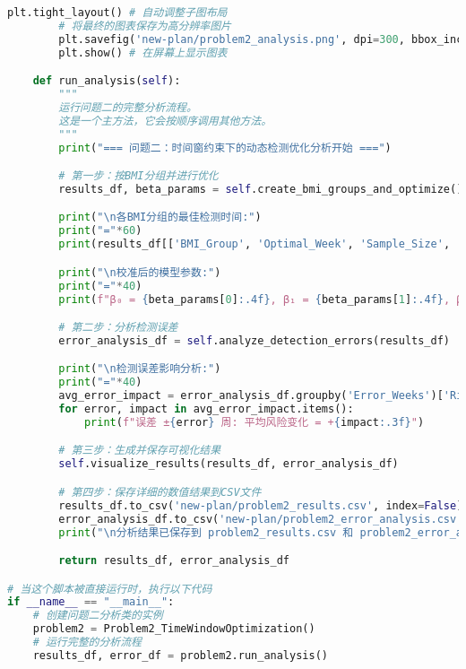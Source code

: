 \documentclass[UTF8, a4paper, 11pt]{ctexart}
\begin{document}
\begin{lstlisting}[language=Python, caption={问题二的解决方案脚本。}]
        plt.tight_layout() # 自动调整子图布局
        # 将最终的图表保存为高分辨率图片
        plt.savefig('new-plan/problem2_analysis.png', dpi=300, bbox_inches='tight')
        plt.show() # 在屏幕上显示图表

    def run_analysis(self):
        """
        运行问题二的完整分析流程。
        这是一个主方法，它会按顺序调用其他方法。
        """
        print("=== 问题二：时间窗约束下的动态检测优化分析开始 ===")

        # 第一步：按BMI分组并进行优化
        results_df, beta_params = self.create_bmi_groups_and_optimize()

        print("\n各BMI分组的最佳检测时间:")
        print("="*60)
        print(results_df[['BMI_Group', 'Optimal_Week', 'Sample_Size', 'Total_Risk']].round(3))

        print("\n校准后的模型参数:")
        print("="*40)
        print(f"β₀ = {beta_params[0]:.4f}, β₁ = {beta_params[1]:.4f}, β₂ = {beta_params[2]:.4f}")

        # 第二步：分析检测误差
        error_analysis_df = self.analyze_detection_errors(results_df)

        print("\n检测误差影响分析:")
        print("="*40)
        avg_error_impact = error_analysis_df.groupby('Error_Weeks')['Risk_Change_Late'].mean()
        for error, impact in avg_error_impact.items():
            print(f"误差 ±{error} 周: 平均风险变化 = +{impact:.3f}")

        # 第三步：生成并保存可视化结果
        self.visualize_results(results_df, error_analysis_df)

        # 第四步：保存详细的数值结果到CSV文件
        results_df.to_csv('new-plan/problem2_results.csv', index=False)
        error_analysis_df.to_csv('new-plan/problem2_error_analysis.csv', index=False)
        print("\n分析结果已保存到 problem2_results.csv 和 problem2_error_analysis.csv")

        return results_df, error_analysis_df

# 当这个脚本被直接运行时，执行以下代码
if __name__ == "__main__":
    # 创建问题二分析类的实例
    problem2 = Problem2_TimeWindowOptimization()
    # 运行完整的分析流程
    results_df, error_df = problem2.run_analysis()
\end{lstlisting}
\end{document}

